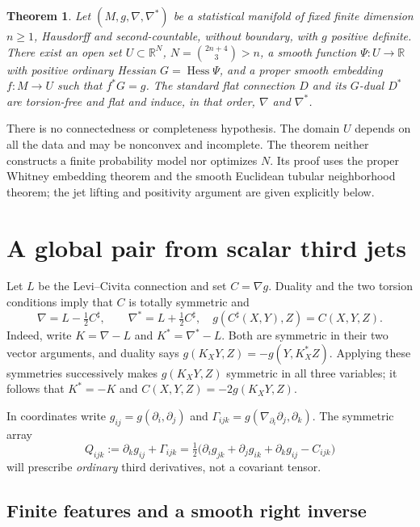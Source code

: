 \documentclass[10pt,letterpaper]{article}
\newtheorem{theorem}{Theorem}
\newcommand{\R}{\mathbb R}
\newcommand{\Hess}{\operatorname{Hess}}
\begin{document}
\begin{theorem}\label{thm:main}
Let $(M,g,\nabla,\nabla^*)$ be a statistical manifold of fixed finite
dimension $n\geq1$, Hausdorff and second-countable, without boundary, with
$g$ positive definite. There exist an open set $U\subset\R^N$,
$N=\binom{2n+4}{3}>n$, a smooth function $\Psi:U\to\R$ with positive
ordinary Hessian $G=\Hess\Psi$, and a proper smooth embedding $f:M\to U$
such that $f^*G=g$. The standard flat connection $D$ and its $G$-dual $D^*$
are torsion-free and flat and induce, in that order, $\nabla$ and $\nabla^*$.
\end{theorem}

There is no connectedness or completeness hypothesis. The domain $U$ depends
on all the data and may be nonconvex and incomplete. The theorem neither
constructs a finite probability model nor optimizes $N$. Its proof uses the
proper Whitney embedding theorem and the smooth Euclidean tubular
neighborhood theorem; the jet lifting and positivity argument are given
explicitly below.

\section{A global pair from scalar third jets}

Let $L$ be the Levi--Civita connection and set $C=\nabla g$. Duality and
the two torsion conditions imply that $C$ is totally symmetric and
\begin{equation}\label{eq:difference}
 \nabla=L-\tfrac12 C^\sharp,\qquad
 \nabla^*=L+\tfrac12 C^\sharp,
 \quad g(C^\sharp(X,Y),Z)=C(X,Y,Z).
\end{equation}
Indeed, write $K=\nabla-L$ and $K^*=\nabla^*-L$. Both are symmetric in
their two vector arguments, and duality says
$g(K_XY,Z)=-g(Y,K^*_XZ)$. Applying these symmetries successively makes
$g(K_XY,Z)$ symmetric in all three variables; it follows that
$K^*=-K$ and $C(X,Y,Z)=-2g(K_XY,Z)$.

In coordinates write $g_{ij}=g(\partial_i,\partial_j)$ and
$\Gamma_{ijk}=g(\nabla_{\partial_i}\partial_j,\partial_k)$.
The symmetric array
\begin{equation}\label{eq:Q}
 Q_{ijk}:=\partial_k g_{ij}+\Gamma_{ijk}
 =\tfrac12\bigl(\partial_i g_{jk}+\partial_j g_{ik}
                         +\partial_k g_{ij}-C_{ijk}\bigr)
\end{equation}
will prescribe \emph{ordinary} third derivatives, not a covariant tensor.

\subsection*{Finite features and a smooth right inverse}
\end{document}
